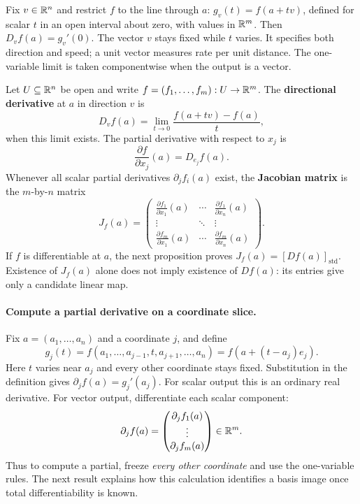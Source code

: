 Fix $v\in\mathbb{R}^n$ and restrict $f$ to the line through $a$:
$g_v(t)=f(a+tv)$, defined for scalar $t$ in an open interval about zero,
with values in $\mathbb{R}^m$. Then $D_vf(a)=g_v'(0)$. The vector $v$ stays
fixed while $t$ varies. It specifies both direction and speed; a unit
vector measures rate per unit distance. The one-variable limit is taken
componentwise when the output is a vector.

\begin{definition}\label{def:jacobian-partials}
Let $U\subseteq\mathbb{R}^n$ be open and write $f=(f_1,\ldots,f_m):U\to\mathbb{R}^m$. The \textbf{directional
derivative} at $a$ in direction $v$ is
\[
D_vf(a)=\lim_{t\to0}\frac{f(a+tv)-f(a)}{t},
\]
when this limit exists.  The partial derivative with respect to $x_j$ is
\[
\frac{\partial f}{\partial x_j}(a)=D_{e_j}f(a).
\]
Whenever all scalar partial derivatives $\partial_jf_i(a)$ exist, the
\textbf{Jacobian matrix} is the $m$-by-$n$ matrix
\[
J_f(a)=
\begin{pmatrix}
\frac{\partial f_1}{\partial x_1}(a)&\cdots&
\frac{\partial f_1}{\partial x_n}(a)\\
\vdots&\ddots&\vdots\\
\frac{\partial f_m}{\partial x_1}(a)&\cdots&
\frac{\partial f_m}{\partial x_n}(a)
\end{pmatrix}.
\]
If $f$ is differentiable at $a$, the next proposition proves
$J_f(a)=[Df(a)]_{\mathrm{std}}$. Existence of $J_f(a)$ alone does not
imply existence of $Df(a)$: its entries give only a candidate linear map.
\end{definition}

\paragraph{Compute a partial derivative on a coordinate slice.}
Fix $a=(a_1,\ldots,a_n)$ and a coordinate $j$, and define
\[
g_j(t)=f(a_1,\ldots,a_{j-1},t,a_{j+1},\ldots,a_n)
=f(a+(t-a_j)e_j).
\]
Here $t$ varies near $a_j$ and every other coordinate stays fixed.
Substitution in the definition gives $\partial_jf(a)=g_j'(a_j)$.
For scalar output this is an ordinary real derivative. For vector output,
differentiate each scalar component:
\[
\partial_jf(a)=
\begin{pmatrix}\partial_jf_1(a)\\\vdots\\\partial_jf_m(a)\end{pmatrix}\in\mathbb{R}^m.
\]
Thus to compute a partial, freeze \emph{every other coordinate} and use
the one-variable rules. The next result explains how this calculation
identifies a basis image once total differentiability is known.

